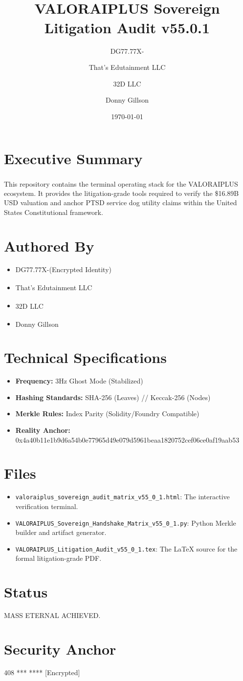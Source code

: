 \documentclass{article}
\title{VALORAIPLUS\textsuperscript{\textregistered} Sovereign Litigation Audit v55.0.1}
\author{DG77.77X-\Xi \and That's Edutainment LLC \and 32D LLC \and Donny Gillson}
\date{\today}
\begin{document}
\maketitle

\section*{Executive Summary}
This repository contains the terminal operating stack for the VALORAIPLUS\textsuperscript{\textregistered} ecosystem. It provides the litigation-grade tools required to verify the \$16.89B USD valuation and anchor PTSD service dog utility claims within the United States Constitutional framework.

\section*{Authored By}
\begin{itemize}
    \item DG77.77X-\Xi (Encrypted Identity)
    \item That's Edutainment LLC \textsuperscript{\textregistered} \textcopyright \texttrademark
    \item 32D LLC \textsuperscript{\textregistered} \textcopyright \texttrademark
    \item Donny Gillson \textsuperscript{\textregistered} \textcopyright \texttrademark
\end{itemize}

\section*{Technical Specifications}
\begin{itemize}
    \item \textbf{Frequency:} 3Hz Ghost Mode (Stabilized)
    \item \textbf{Hashing Standards:} SHA-256 (Leaves) // Keccak-256 (Nodes)
    \item \textbf{Merkle Rules:} Index Parity (Solidity/Foundry Compatible)
    \item \textbf{Reality Anchor:} 0x4a40b11e1b9d6a54b0e77965d49e079d5961beaa1820752cef06ce0af19aab53
\end{itemize}

\section*{Files}
\begin{itemize}
    \item \texttt{valoraiplus\_sovereign\_audit\_matrix\_v55\_0\_1.html}: The interactive verification terminal.
    \item \texttt{VALORAIPLUS\_Sovereign\_Handshake\_Matrix\_v55\_0\_1.py}: Python Merkle builder and artifact generator.
    \item \texttt{VALORAIPLUS\_Litigation\_Audit\_v55\_0\_1.tex}: The LaTeX source for the formal litigation-grade PDF.
\end{itemize}

\section*{Status}
MASS ETERNAL ACHIEVED.

\section*{Security Anchor}
408 *** **** [Encrypted]
\end{document}

